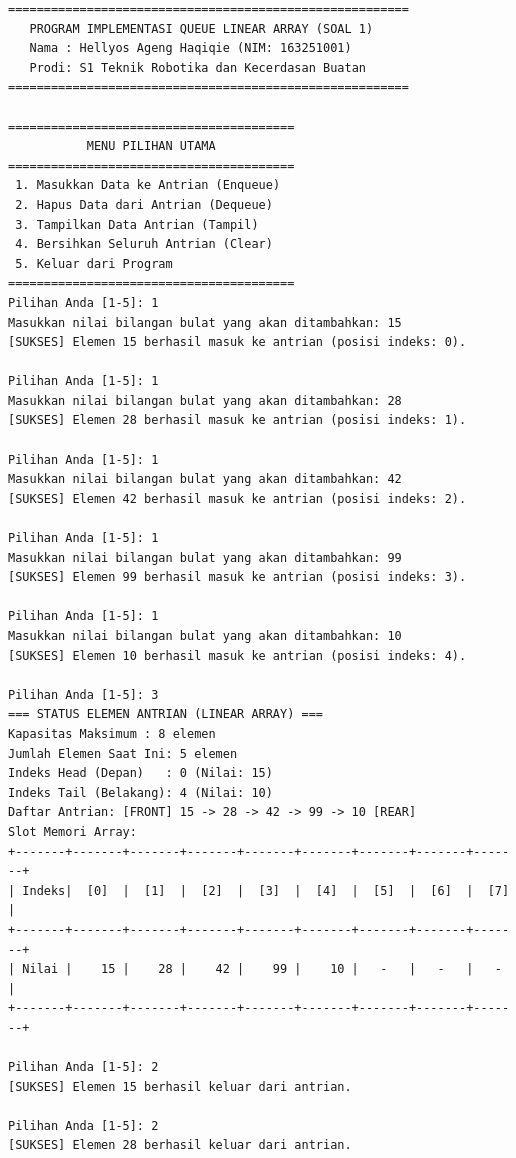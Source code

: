 \documentclass[11pt,a4paper]{article}
\begin{document}
\begin{lstlisting}[style=cmdoutput]
========================================================
   PROGRAM IMPLEMENTASI QUEUE LINEAR ARRAY (SOAL 1)    
   Nama : Hellyos Ageng Haqiqie (NIM: 163251001)       
   Prodi: S1 Teknik Robotika dan Kecerdasan Buatan      
========================================================

========================================
           MENU PILIHAN UTAMA           
========================================
 1. Masukkan Data ke Antrian (Enqueue) 
 2. Hapus Data dari Antrian (Dequeue)  
 3. Tampilkan Data Antrian (Tampil)    
 4. Bersihkan Seluruh Antrian (Clear)  
 5. Keluar dari Program                
========================================
Pilihan Anda [1-5]: 1
Masukkan nilai bilangan bulat yang akan ditambahkan: 15
[SUKSES] Elemen 15 berhasil masuk ke antrian (posisi indeks: 0).

Pilihan Anda [1-5]: 1
Masukkan nilai bilangan bulat yang akan ditambahkan: 28
[SUKSES] Elemen 28 berhasil masuk ke antrian (posisi indeks: 1).

Pilihan Anda [1-5]: 1
Masukkan nilai bilangan bulat yang akan ditambahkan: 42
[SUKSES] Elemen 42 berhasil masuk ke antrian (posisi indeks: 2).

Pilihan Anda [1-5]: 1
Masukkan nilai bilangan bulat yang akan ditambahkan: 99
[SUKSES] Elemen 99 berhasil masuk ke antrian (posisi indeks: 3).

Pilihan Anda [1-5]: 1
Masukkan nilai bilangan bulat yang akan ditambahkan: 10
[SUKSES] Elemen 10 berhasil masuk ke antrian (posisi indeks: 4).

Pilihan Anda [1-5]: 3
=== STATUS ELEMEN ANTRIAN (LINEAR ARRAY) ===
Kapasitas Maksimum : 8 elemen
Jumlah Elemen Saat Ini: 5 elemen
Indeks Head (Depan)   : 0 (Nilai: 15)
Indeks Tail (Belakang): 4 (Nilai: 10)
Daftar Antrian: [FRONT] 15 -> 28 -> 42 -> 99 -> 10 [REAR]
Slot Memori Array:
+-------+-------+-------+-------+-------+-------+-------+-------+-------+
| Indeks|  [0]  |  [1]  |  [2]  |  [3]  |  [4]  |  [5]  |  [6]  |  [7]  |
+-------+-------+-------+-------+-------+-------+-------+-------+-------+
| Nilai |    15 |    28 |    42 |    99 |    10 |   -   |   -   |   -   |
+-------+-------+-------+-------+-------+-------+-------+-------+-------+

Pilihan Anda [1-5]: 2
[SUKSES] Elemen 15 berhasil keluar dari antrian.

Pilihan Anda [1-5]: 2
[SUKSES] Elemen 28 berhasil keluar dari antrian.


\end{lstlisting}
\end{document}

